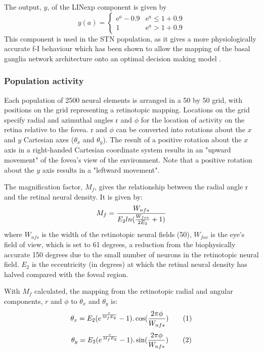 \documentclass{frontiersSCNS}
\begin{document}
The output, $y$, of the LINexp component is given by
\[
   y(a) = \begin{cases}
      \mathrm{e}^{a}-0.9   & \mathrm{e}^a \leq 1+0.9 \\
      1   & \mathrm{e}^a > 1+0.9
   \end{cases}
\]
This component is used in the STN population, as it gives a more
physiologically accurate f-I
behaviour 
which has been shown to allow the mapping of the basal ganglia network
architecture onto an optimal decision making
model .

%
%

\subsubsection{Population activity}

Each population of 2500 neural elements is arranged in a 50 by 50
grid, with positions on the grid representing a retinotopic
mapping. Locations on the grid specify radial and azimuthal angles r
and $\phi$ for the location of activity on the retina relative to the
fovea. r and $\phi$ can be converted into rotations about the $x$ and
$y$ Cartesian axes ($\theta_x$ and $\theta_y$). The result of a
positive rotation about the $x$ axis in a right-handed Cartesian
coordinate system results in an "upward movement" of the fovea's view
of the environment. Note that a positive rotation about the $y$ axis
results in a "leftward movement".

The magnification factor, $M_f$, gives the relationship between the
radial angle r and the retinal neural density. It is given by:
\[
   M_f = {W_{nfs} \over E_2 ln ({W_{fov} \over 2 E_2} + 1)}
\]
where $W_{nfs}$ is the width of the retinotopic neural fields (50),
$W_{fov}$ is the eye's field of view, which is set to 61 degrees, a
reduction from the biophysically accurate 150 degrees due to the small
number of neurons in the retinotopic neural field. $E_2$ is the
eccentricity (in degrees) at which the retinal neural density has
halved compared with the foveal region.

With $M_f$ calculated, the mapping from the retinotopic radial and
angular components, $r$ and $\phi$ to $\theta_x$ and $\theta_y$ is:
\[
   \theta_x = E_2 (e^{{r \over M_f E_2}} - 1).\cos({2 \pi \phi \over
   W_{nfs}}) \tag{1}
\]
\[
   \theta_y = E_2 (e^{{r \over M_f E_2}} - 1).\sin({2 \pi \phi \over W_{nfs}}) \tag{2}
\]
\end{document}
